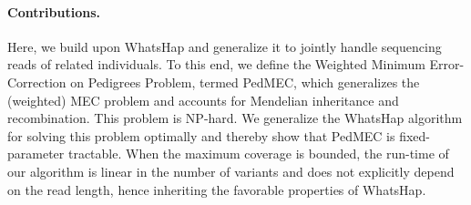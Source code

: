 \paragraph{Contributions.}
Here, we build upon WhatsHap \citep{Patterson2014,Patterson2015} and generalize it to jointly handle sequencing reads of related individuals.
% 
To this end, we define the Weighted Minimum Error-Correction on Pedigrees Problem, termed PedMEC, which generalizes the (weighted) MEC problem and accounts for Mendelian inheritance and recombination.
This problem is NP-hard.
We generalize the WhatsHap algorithm for solving this problem optimally and thereby show that PedMEC is fixed-parameter tractable.
When the maximum coverage is bounded, the run-time of our algorithm is linear in the number of variants and does not explicitly depend on the read length, hence inheriting the favorable properties of WhatsHap.

